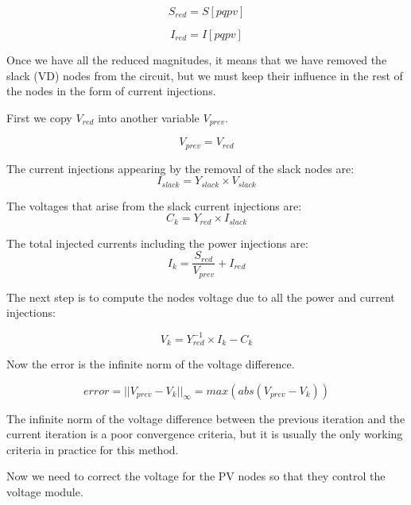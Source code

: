 \documentclass[nols,a4paper,twoside,notoc,fleqn]{tufte-book}
\begin{document}
\begin{equation}
S_{red} = S[pqpv]
\end{equation}

\begin{equation}
I_{red} = I[pqpv]
\end{equation}

Once we have all the reduced magnitudes, it means that we have removed the slack (VD) nodes from the circuit, but we must keep their influence in the rest of the nodes in the form of current injections.

First we copy $V_{red}$ into another variable $V_{prev}$.

\begin{equation}
V_{prev} = V_{red}
\end{equation}

The current injections appearing by the removal of the slack nodes are:
\begin{equation}
I_{slack} = Y_{slack} \times V_{slack}
\end{equation}

The voltages that arise from the slack current injections are:
\begin{equation}
C_k = Y_{red} \times I_{slack}
\end{equation}

The total injected currents including the power injections are:
\begin{equation}
I_k = \frac{S_{red}}{V_{prev}} + I_{red}
\label{eq:zm_ik}
\end{equation}

The next step is to compute the nodes voltage due to all the power and current injections:

\begin{equation}
V_k = Y_{red}^{-1} \times I_k - C_k
\end{equation}

Now the error is the infinite norm of the voltage difference.

\begin{equation}
error = ||V_{prev} - V_k ||_{\infty} = max(abs(V_{prev} - V_k ))
\end{equation}

The infinite norm of the voltage difference between the previous iteration and the current iteration is a poor convergence criteria, but it is usually the only working criteria in practice for this method.

Now we need to correct the voltage for the PV nodes so that they control the voltage module.
\end{document}

